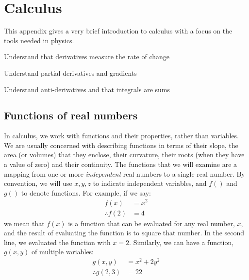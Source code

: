 %
\chapter{Calculus}
\label{calculus}
This appendix gives a very brief introduction to calculus with a focus on the tools needed in physics. 
 \vspace{1cm}
\begin{learningObjectives}
\item Understand that derivatives measure the rate of change
\item Understand partial derivatives and gradients
\item Understand anti-derivatives and that integrals are sums
\end{learningObjectives}

\section{Functions of real numbers}
In calculus, we work with functions and their properties, rather than variables. We are usually concerned with describing functions in terms of their slope, the area (or volumes) that they enclose, their curvature, their roots (when they have a value of zero) and their continuity. The functions that we will examine are a mapping from one or more \textit{independent} real numbers to a single real number. By convention, we will use $x,y,z$ to indicate independent variables, and $f()$ and $g()$ to denote functions. For example, if we say:
\begin{align*}
f(x) &= x^2\\
\therefore f(2) &= 4
\end{align*}
we mean that $f(x)$ is a function that can be evaluated for any real number, $x$, and the result of evaluating the function is to square that number. In the second line, we evaluated the function with $x=2$. Similarly, we can have a function, $g(x,y)$ of multiple variables:
\begin{align*}
g(x,y)&=x^2+2y^2\\
\therefore g(2,3)&=22
\end{align*}

